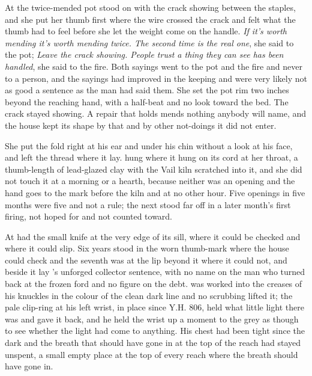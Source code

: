 At  the twice-mended pot stood on  with the crack showing between the staples, and she put her thumb first where the wire crossed the crack and felt what the thumb had to feel before she let the weight come on the handle. \emph{If it's worth mending it's worth mending twice. The second time is the real one}, she said to the pot; \emph{Leave the crack showing. People trust a thing they can see has been handled}, she said to the fire. Both sayings went to the pot and the fire and never to a person, and the sayings had improved in the keeping and were very likely not as good a sentence as the man had said them. She set the pot rim two inches beyond the reaching hand, with a half-beat and no look toward the bed. The crack stayed showing. A repair that holds mends nothing anybody will name, and the house kept its shape by that and by other not-doings it did not enter.

She put the fold right at his ear and under his chin without a look at his face, and left the thread where it lay.  hung where it hung on its cord at her throat, a thumb-length of lead-glazed clay with the Vail kiln scratched into it, and she did not touch it at a morning or a hearth, because neither was an opening and the hand goes to the mark before the kiln and at no other hour. Five openings in five months were five and not a rule; the next stood far off in a later month's first firing, not hoped for and not counted toward.

\scenebreak

At   had the small knife at the very edge of its sill, where it could be checked and where it could slip. Six years stood in the worn thumb-mark where the house could check and the seventh was at the lip beyond it where it could not, and beside it lay 's unforged collector sentence, with no name on the man who turned back at the frozen ford and no figure on the debt.  was worked into the creases of his knuckles in the colour of the clean dark line and no scrubbing lifted it; the pale clip-ring at his left wrist, in place since Y.H. 806, held what little light there was and gave it back, and he held the wrist up a moment to the grey as though to see whether the light had come to anything. His chest had been tight since the dark and the breath that should have gone in at the top of the reach had stayed unspent, a small empty place at the top of every reach where the breath should have gone in.

